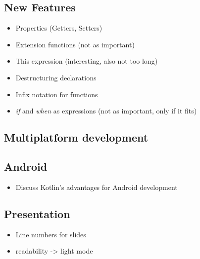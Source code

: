 \documentclass[a4paper, 11pt]{article}
\begin{document}
  \subsection{New Features}
    \begin{itemize}
      \item Properties (Getters, Setters)
      \item Extension functions (not as important)
      \item This expression (interesting, also not too long)
      \item Destructuring declarations
      \item Infix notation for functions
      \item \textit{if} and \textit{when} as expressions (not as important, only if it fits)
    \end{itemize}

  \subsection{Multiplatform development}
  
  \subsection{Android}
    \begin{itemize}
      \item Discuss Kotlin's advantages for Android development
    \end{itemize}

  \subsection{Presentation}
  \begin{itemize}
    \item Line numbers for slides
    \item readability -> light mode
  \end{itemize}
\end{document}
